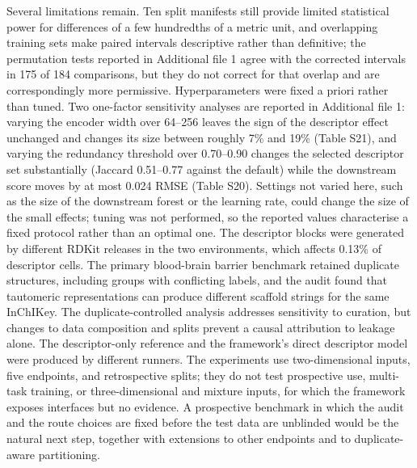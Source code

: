 Several limitations remain. Ten split manifests still provide limited statistical power for differences of a few hundredths of a metric unit, and overlapping training sets make paired intervals descriptive rather than definitive; the permutation tests reported in Additional file 1 agree with the corrected intervals in 175 of 184 comparisons, but they do not correct for that overlap and are correspondingly more permissive. Hyperparameters were fixed a priori rather than tuned. Two one-factor sensitivity analyses are reported in Additional file 1: varying the encoder width over 64--256 leaves the sign of the descriptor effect unchanged and changes its size between roughly 7\% and 19\% (Table S21), and varying the redundancy threshold over 0.70--0.90 changes the selected descriptor set substantially (Jaccard 0.51--0.77 against the default) while the downstream score moves by at most 0.024 RMSE (Table S20). Settings not varied here, such as the size of the downstream forest or the learning rate, could change the size of the small effects; tuning was not performed, so the reported values characterise a fixed protocol rather than an optimal one. The descriptor blocks were generated by different RDKit releases in the two environments, which affects 0.13\% of descriptor cells. The primary blood-brain barrier benchmark retained duplicate structures, including groups with conflicting labels, and the audit found that tautomeric representations can produce different scaffold strings for the same InChIKey. The duplicate-controlled analysis addresses sensitivity to curation, but changes to data composition and splits prevent a causal attribution to leakage alone. The descriptor-only reference and the framework's direct descriptor model were produced by different runners. The experiments use two-dimensional inputs, five endpoints, and retrospective splits; they do not test prospective use, multi-task training, or three-dimensional and mixture inputs, for which the framework exposes interfaces but no evidence. A prospective benchmark in which the audit and the route choices are fixed before the test data are unblinded would be the natural next step, together with extensions to other endpoints and to duplicate-aware partitioning.
